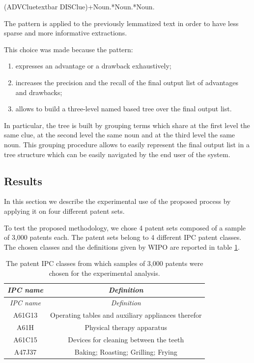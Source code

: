 \documentclass[]{book}
\providecommand{\tightlist}{%
  \setlength{\itemsep}{0pt}\setlength{\parskip}{0pt}}
\begin{document}
(ADVClue\textbar{}textbar DISClue)+Noun.*Noun.*Noun.

The pattern is applied to the previously lemmatized text in order to
have less sparse and more informative extractions.

This choice was made because the pattern:

\begin{enumerate}
\def\labelenumi{\arabic{enumi}.}
\tightlist
\item
  expresses an advantage or a drawback exhaustively;
\item
  increases the precision and the recall of the final output list of
  advantages and drawbacks;
\item
  allows to build a three-level named based tree over the final output
  list.
\end{enumerate}

In particular, the tree is built by grouping terms which share at the
first level the same clue, at the second level the same noun and at the
third level the same noun. This grouping procedure allows to easily
represent the final output list in a tree structure which can be easily
navigated by the end user of the system.

\subsection{Results}\label{results-1}

In this section we describe the experimental use of the proposed process
by applying it on four different patent sets.

To test the proposed methodology, we chose 4 patent sets composed of a
sample of 3,000 patents each. The patent sets belong to 4 different IPC
patent classes. The chosen classes and the definitions given by WIPO are
reported in table \ref{tab:advdrwarticleexampleipcclasses}.

\begin{longtable}[]{@{}cc@{}}
\caption{\label{tab:advdrwarticleexampleipcclasses} The patent IPC classes
from which samples of 3,000 patents were chosen for the experimental
analysis.}\tabularnewline
\toprule
\emph{IPC name} & \emph{Definition}\tabularnewline
\midrule
\endfirsthead
\toprule
\emph{IPC name} & \emph{Definition}\tabularnewline
\midrule
\endhead
A61G13 & Operating tables and auxiliary appliances
therefor\tabularnewline
A61H & Physical therapy apparatus\tabularnewline
A61C15 & Devices for cleaning between the teeth\tabularnewline
A47J37 & Baking; Roasting; Grilling; Frying\tabularnewline
\bottomrule
\end{longtable}
\end{document}
